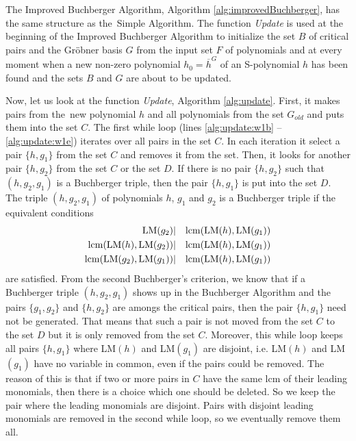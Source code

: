 The Improved Buchberger Algorithm, Algorithm \ref{alg:improvedBuchberger}, has the same structure as the~Simple Algorithm. The function \textit{Update} is used at the beginning of the Improved Buchberger Algorithm to initialize the set $B$ of critical pairs and the Gr\"obner basis $G$ from the input set $F$ of polynomials and at every moment when a new non-zero polynomial $h_0 = \overline{h}^G$ of an S-polynomial $h$ has been found and the sets $B$ and $G$ are about to be updated.



Now, let us look at the function \textit{Update}, Algorithm \ref{alg:update}. First, it makes pairs from the~new polynomial $h$ and all polynomials from the set $G_{old}$ and puts them into the set $C$. The first while loop (lines \ref{alg:update:w1b} -- \ref{alg:update:w1e}) iterates over all pairs in the set $C$. In each iteration it select a pair $\{h, g_1\}$ from the set $C$ and removes it from the set. Then, it looks for another pair $\{h, g_2\}$ from the set $C$ or the set $D$. If there is no pair $\{h, g_2\}$ such that $(h, g_2, g_1)$ is a Buchberger triple, then the pair $\{h, g_1\}$ is put into the set $D$. The triple $(h, g_2, g_1)$ of polynomials $h$, $g_1$ and $g_2$ is a Buchberger triple if the equivalent conditions 
\begin{eqnarray}
	\operatorname{LM}(g_2) &|& \operatorname{lcm}(\operatorname{LM}(h), \operatorname{LM}(g_1))\\
	\operatorname{lcm}(\operatorname{LM}(h), \operatorname{LM}(g_2) ) &|& \operatorname{lcm}(\operatorname{LM}(h), \operatorname{LM}(g_1))\\
	\operatorname{lcm}(\operatorname{LM}(g_2), \operatorname{LM}(g_1)) &|& \operatorname{lcm}(\operatorname{LM}(h), \operatorname{LM}(g_1))
\end{eqnarray}
are satisfied. From the second Buchberger's criterion, we know that if a Buchberger triple $(h, g_2, g_1)$ shows up in the Buchberger Algorithm and the pairs $\{g_1, g_2\}$ and $\{h, g_2\}$ are amongs the critical pairs, then the pair $\{h, g_1\}$ need not be generated. That means that such a pair is not moved from the set $C$ to the set $D$ but it is only removed from the set $C$. Moreover, this while loop keeps all pairs $\{h, g_1\}$ where LM$(h)$ and LM$(g_1)$ are disjoint, i.e. LM$(h)$ and LM$(g_1)$ have no variable in common, even if the pairs could be removed. The reason of this is that if two or more pairs in $C$ have the same lcm of their leading monomials, then there is a choice which one should be deleted. So we keep the pair where the leading monomials are disjoint. Pairs with disjoint leading monomials are removed in the second while loop, so we eventually remove them all.

